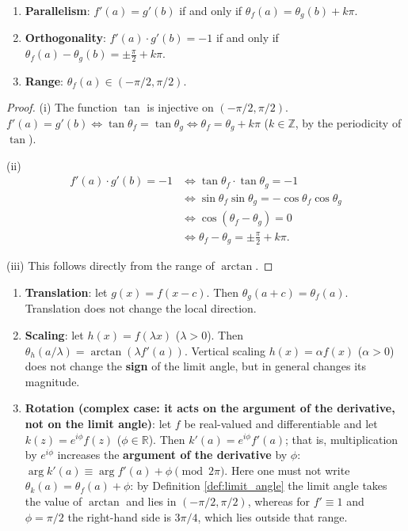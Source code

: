 \begin{proposition}\label{prop:limit_angle_properties}
\begin{enumerate}[label=(\roman*)]
    \item \textbf{Parallelism}: $f'(a) = g'(b)$ if and only if $\theta_f(a) = \theta_g(b) + k\pi$.
    \item \textbf{Orthogonality}: $f'(a) \cdot g'(b) = -1$ if and only if $\theta_f(a) - \theta_g(b) = \pm \frac{\pi}{2} + k\pi$.
    \item \textbf{Range}: $\theta_f(a) \in (-\pi/2, \pi/2)$.
\end{enumerate}
\end{proposition}

\begin{proof}
(i) The function $\tan$ is injective on $(-\pi/2, \pi/2)$. $f'(a) = g'(b) \iff \tan\theta_f = \tan\theta_g \iff \theta_f = \theta_g + k\pi$ ($k \in \mathbb{Z}$, by the periodicity of $\tan$).

(ii)
\begin{align*}
f'(a) \cdot g'(b) = -1
&\iff \tan\theta_f \cdot \tan\theta_g = -1 \\
&\iff \sin\theta_f \sin\theta_g = -\cos\theta_f \cos\theta_g \\
&\iff \cos(\theta_f - \theta_g) = 0 \\
&\iff \theta_f - \theta_g = \pm \frac{\pi}{2} + k\pi.
\end{align*}

(iii) This follows directly from the range of $\arctan$.
\end{proof}

\begin{proposition}\label{prop:limit_angle_transformations}
\begin{enumerate}[label=(\roman*)]
    \item \textbf{Translation}: let $g(x) = f(x - c)$. Then $\theta_g(a+c) = \theta_f(a)$. Translation does not change the local direction.
    \item \textbf{Scaling}: let $h(x) = f(\lambda x)$ ($\lambda > 0$). Then $\theta_h(a/\lambda) = \arctan(\lambda f'(a))$. Vertical scaling $h(x) = \alpha f(x)$ ($\alpha > 0$) does not change the \textbf{sign} of the limit angle, but in general changes its magnitude.
    \item \textbf{Rotation (complex case: it acts on the argument of the derivative, not on the limit angle)}: let $f$ be real-valued and differentiable and let $k(z) = e^{i\phi} f(z)$ ($\phi \in \mathbb{R}$). Then $k'(a) = e^{i\phi} f'(a)$; that is, multiplication by $e^{i\phi}$ increases the \textbf{argument of the derivative} by $\phi$: $\arg k'(a) \equiv \arg f'(a) + \phi \pmod{2\pi}$. Here one must not write $\theta_k(a) = \theta_f(a) + \phi$: by Definition \ref{def:limit_angle} the limit angle takes the value of $\arctan$ and lies in $(-\pi/2, \pi/2)$, whereas for $f' \equiv 1$ and $\phi = \pi/2$ the right-hand side is $3\pi/4$, which lies outside that range.
\end{enumerate}
\end{proposition}

